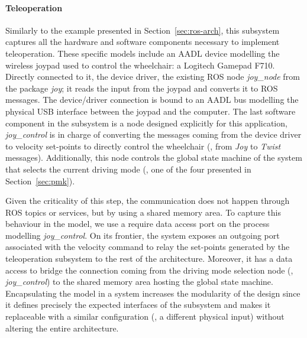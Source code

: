 \paragraph{Teleoperation} Similarly to the example presented in Section~\ref{sec:ros-arch}, this subsystem captures all the hardware and software components necessary to implement teleoperation. These specific models include an AADL device modelling the wireless joypad used to control the wheelchair: a Logitech Gamepad F710. Directly connected to it, the device driver, the existing ROS node \textit{joy\_node} from the package \textit{joy}; it reads the input from the joypad and converts it to ROS messages. The device/driver connection is bound to an AADL bus modelling the physical USB interface between the joypad and the computer. The last software component in the subsystem is a node designed explicitly for this application, \textit{joy\_control} is in charge of converting the messages coming from the device driver to velocity set-points to directly control the wheelchair (\ie, from \textit{Joy} to \textit{Twist} messages). Additionally, this node controls the global state machine of the system that selects the current driving mode (\ie, one of the four presented in Section~\ref{sec:pmk}).

Given the criticality of this step, the communication does not happen through ROS topics or services, but by using a shared memory area. To capture this behaviour in the model, we use a require data access port on the process modelling \textit{joy\_control}. On its frontier, the system exposes an outgoing port associated with the velocity command to relay the set-points generated by the teleoperation subsystem to the rest of the architecture. Moreover, it has a data access to bridge the connection coming from the driving mode selection node (\ie, \textit{joy\_control}) to the shared memory area hosting the global state machine. Encapsulating the model in a system increases the modularity of the design since it defines precisely the expected interfaces of the subsystem and makes it replaceable with a similar configuration (\eg, a different physical input) without altering the entire architecture.

